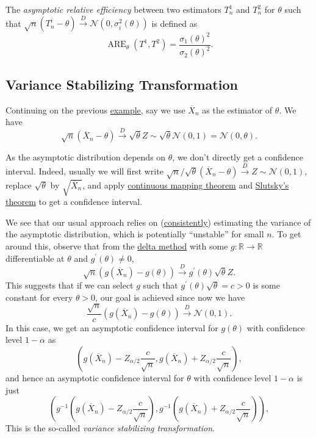 \begin{definition}\label{def:asymptotic-relative-efficiency}
	The \emph{asymptotic relative efficiency} between two estimators \(T^1_n\) and \(T^2_n\) for \(\theta \) such that \(\sqrt{n} (T_n^i - \theta ) \overset{D}{\to} \mathcal{N} (0, \sigma _i^2(\theta ))\) is defined as
	\[
		\operatorname{ARE}_\theta (T^1, T^2) = \frac{\sigma _1(\theta )^2}{\sigma _2(\theta )^2}.
	\]
\end{definition}

\subsection{Variance Stabilizing Transformation}
Continuing on the previous \hyperref[eg:ARE]{example}, say we use \(\overline{X} _n\) as the estimator of \(\theta \). We have
\[
	\sqrt{n} (\overline{X} _n - \theta ) \overset{D}{\to} \sqrt{\theta } Z \sim \sqrt{\theta } \mathcal{N} (0, 1) = \mathcal{N} (0, \theta ) .
\]

\begin{prev}
	As the asymptotic distribution depends on \(\theta \), we don't directly get a confidence interval. Indeed, usually we will first write \(\sqrt{n} / \sqrt{\theta } (\overline{X} _n - \theta ) \overset{D}{\to} Z \sim \mathcal{N} (0, 1)\), replace \(\sqrt{\theta } \) by \(\sqrt{\overline{X} _n} \), and apply \hyperref[thm:continuous-mapping]{continuous mapping theorem} and \hyperref[thm:Slutsky]{Slutsky's theorem} to get a confidence interval.
\end{prev}

We see that our usual approach relies on (\hyperref[def:consistent]{consistently}) estimating the variance of the asymptotic distribution, which is potentially ``unstable'' for small \(n\). To get around this, observe that from the \hyperref[thm:delta-method]{delta method} with some \(g \colon \mathbb{R} \to \mathbb{R} \) differentiable at \(\theta \) and \(g^{\prime} (\theta ) \neq 0\),
\[
	\sqrt{n} (g(\overline{X} _n) - g(\theta )) \overset{D}{\to} g^{\prime} (\theta ) \sqrt{\theta } Z.
\]
This suggests that if we can select \(g\) such that \(g^{\prime} (\theta ) \sqrt{\theta } = c > 0\) is some constant for every \(\theta > 0\), our goal is achieved since now we have
\[
	\frac{\sqrt{n}}{c} (g(\overline{X} _n) - g(\theta )) \overset{D}{\to} \mathcal{N} (0, 1).
\]
In this case, we get an asymptotic confidence interval for \(g(\theta )\) with confidence level \(1 - \alpha \) as
\[
	\left( g(\overline{X} _n) - Z_{\alpha / 2} \frac{c}{\sqrt{n} } , g(\overline{X} _n) + Z_{\alpha / 2} \frac{c}{\sqrt{n} } \right),
\]
and hence an asymptotic confidence interval for \(\theta \) with confidence level \(1 - \alpha \) is just
\[
	\left( g^{-1} \left( g(\overline{X} _n) - Z_{\alpha / 2} \frac{c}{\sqrt{n} } \right) , g^{-1} \left( g(\overline{X} _n) + Z_{\alpha / 2} \frac{c}{\sqrt{n} } \right) \right),
\]
This is the so-called \emph{variance stabilizing transformation}.

